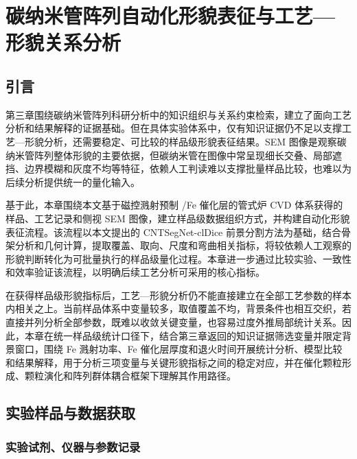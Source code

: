 \chapter{碳纳米管阵列自动化形貌表征与工艺—形貌关系分析}
\label{chap:morphology_method}

\section{引言}

第三章围绕碳纳米管阵列科研分析中的知识组织与关系约束检索，建立了面向工艺分析和结果解释的证据基础。但在具体实验体系中，仅有知识证据仍不足以支撑工艺—形貌分析，还需要稳定、可比较的样品级形貌表征结果。SEM 图像是观察碳纳米管阵列整体形貌的主要依据，但碳纳米管在图像中常呈现细长交叠、局部遮挡、边界模糊和灰度不均等特征，依赖人工判读难以支撑批量样品比较，也难以为后续分析提供统一的量化输入。

基于此，本章围绕本文基于磁控溅射预制 /Fe 催化层的管式炉 CVD 体系获得的样品、工艺记录和侧视 SEM 图像，建立样品级数据组织方式，并构建自动化形貌表征流程。该流程以本文提出的 CNTSegNet-clDice 前景分割方法为基础，结合骨架分析和几何计算，提取覆盖、取向、尺度和弯曲相关指标，将较依赖人工观察的形貌判断转化为可批量执行的样品级量化过程。本章进一步通过比较实验、一致性和效率验证该流程，以明确后续工艺分析可采用的核心指标。

在获得样品级形貌指标后，工艺—形貌分析仍不能直接建立在全部工艺参数的样本内相关之上。当前样品体系中变量较多，取值覆盖不均，背景条件也相互交织，若直接并列分析全部参数，既难以收敛关键变量，也容易过度外推局部统计关系。因此，本章在统一样品级统计口径下，结合第三章返回的知识证据筛选变量并限定背景窗口，围绕 Fe 溅射功率、Fe 催化层厚度和退火时间开展统计分析、模型比较和结果解释，用于分析三项变量与关键形貌指标之间的稳定对应，并在催化颗粒形成、颗粒演化和阵列群体耦合框架下理解其作用路径。

\section{实验样品与数据获取}

\subsection{实验试剂、仪器与参数记录}


